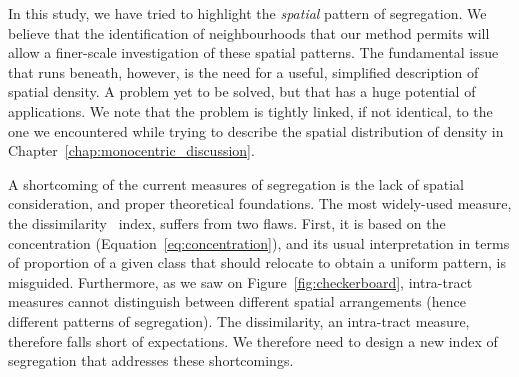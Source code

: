 In this study, we have tried to highlight the \emph{spatial} pattern of
segregation.  We believe that the identification of neighbourhoods that our
method permits will allow a finer-scale investigation of these spatial patterns.
The fundamental issue that runs beneath, however,  is the need for a useful,
simplified description of spatial density. A problem yet to be solved, but that
has a huge potential of applications. We note that the problem is tightly
linked, if not identical, to the one we encountered while trying to describe the
spatial distribution of density in Chapter~\ref{chap:monocentric_discussion}.

A shortcoming of the current measures of segregation is the lack of spatial
consideration, and proper theoretical foundations. The most widely-used measure,
the dissimilarity~\cite{Duncan:1955m} index, suffers from two flaws. First, it
is based on the concentration (Equation~\ref{eq:concentration}), and its usual
interpretation in terms of proportion of a given class that should relocate to
obtain a uniform pattern, is misguided. Furthermore, as we saw on
Figure~\ref{fig:checkerboard}, intra-tract measures cannot distinguish between
different spatial arrangements (hence different patterns of segregation). The
dissimilarity, an intra-tract measure, therefore falls short of expectations. We
therefore need to design a new index of segregation that addresses these
shortcomings.
